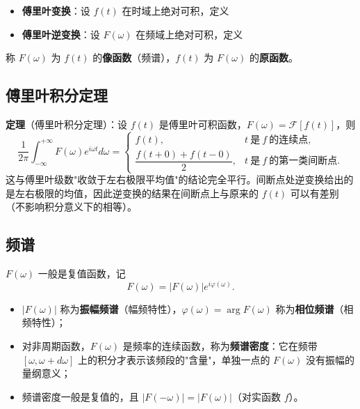 \begin{itemize}
    \item \textbf{傅里叶变换}：设 \(f(t)\) 在时域上绝对可积，定义
\end{itemize}


\begin{itemize}
    \item \textbf{傅里叶逆变换}：设 \(F(\omega)\) 在频域上绝对可积，定义
\end{itemize}


称 \(F(\omega)\) 为 \(f(t)\) 的\textbf{像函数}（频谱），\(f(t)\) 为 \(F(\omega)\) 的\textbf{原函数}。


\subsection{傅里叶积分定理}

\textbf{定理}（傅里叶积分定理）：设 \(f(t)\) 是傅里叶可积函数，\(F(\omega)=\mathscr{F}[f(t)]\)，则
\[
\frac{1}{2\pi}\int_{-\infty}^{+\infty}F(\omega)e^{i\omega t}d\omega=
\begin{cases}
f(t), & t\ \text{是}\ f\ \text{的连续点},\\[4pt]
\dfrac{f(t+0)+f(t-0)}{2}, & t\ \text{是}\ f\ \text{的第一类间断点}.
\end{cases}
\]
这与傅里叶级数"收敛于左右极限平均值"的结论完全平行。间断点处逆变换给出的是左右极限的均值，因此逆变换的结果在间断点上与原来的 \(f(t)\) 可以有差别（不影响积分意义下的相等）。

\subsection{频谱}

\(F(\omega)\) 一般是复值函数，记
\[
F(\omega)=|F(\omega)|e^{i\varphi(\omega)} .
\]
\begin{itemize}
    \item \(|F(\omega)|\) 称为\textbf{振幅频谱}（幅频特性），\(\varphi(\omega)=\arg F(\omega)\) 称为\textbf{相位频谱}（相频特性）；
    \item 对非周期函数，\(F(\omega)\) 是频率的连续函数，称为\textbf{频谱密度}：它在频带 \([\omega,\omega+d\omega]\) 上的积分才表示该频段的"含量"，单独一点的 \(F(\omega)\) 没有振幅的量纲意义；
    \item 频谱密度一般是复值的，且 \(|F(-\omega)|=|F(\omega)|\)（对实函数 \(f\)）。
\end{itemize}

